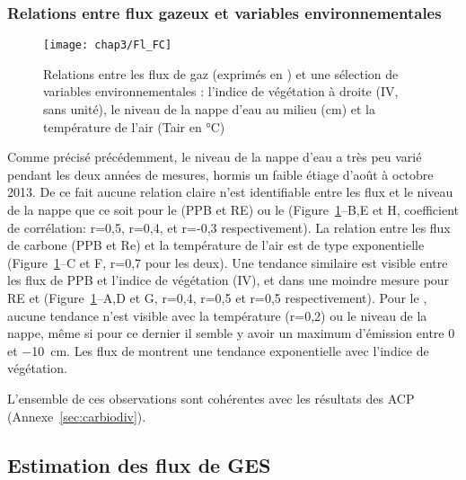 \subsubsection{Relations entre flux gazeux et variables environnementales}

\begin{figure}[!htb]
\centering
\texttt{[image: chap3/Fl\_FC]}
\caption{Relations entre les flux de gaz (exprimés en \si{\uml}) et une sélection de variables environnementales : l'indice de végétation à droite (IV, sans unité), le niveau de la nappe d'eau au milieu (cm) et la température de l'air (Tair en \si{\degreeCelsius})}
\label{fig:Fl_FC}
\end{figure}

Comme précisé précédemment, le niveau de la nappe d'eau a très peu varié pendant les deux années de mesures, hormis un faible étiage d'août à octobre 2013.
De ce fait aucune relation claire n'est identifiable entre les flux et le niveau de la nappe que ce soit pour le \coo (PPB et RE) ou le \chh (Figure~\ref{fig:Fl_FC}--B,E et H, coefficient de corrélation: r=0,5, r=0,4, et r=-0,3 respectivement).
La relation entre les flux de carbone (PPB et Re) et la température de l'air est de type exponentielle (Figure~\ref{fig:Fl_FC}--C et F, r=0,7 pour les deux).
Une tendance similaire est visible entre les flux de PPB et l'indice de végétation (IV), et dans une moindre mesure pour RE et \chh (Figure~\ref{fig:Fl_FC}--A,D et G, r=0,4, r=0,5 et r=0,5 respectivement).
Pour le \chh, aucune tendance n'est visible avec la température (r=0,2) ou le niveau de la nappe, même si pour ce dernier il semble y avoir un maximum d'émission entre 0 et \SI{-10}{\centi\metre}.
Les flux de \chh montrent une tendance exponentielle avec l'indice de végétation.

L'ensemble de ces observations sont cohérentes avec les résultats des ACP (Annexe~\ref{sec:carbiodiv}).

\subsection{Estimation des flux de GES}

